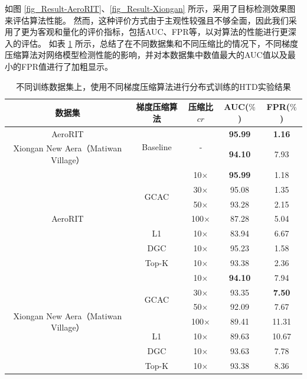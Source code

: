\documentclass{xdupgthesis}
\begin{document}
如图 \ref{fig_Result-AeroRIT}、\ref{fig_Result-Xiongan} 所示，采用了目标检测效果图来评估算法性能。
然而，这种评价方式由于主观性较强且不够全面，因此我们采用了更为客观和量化的评价指标，包括AUC、FPR等，以对算法的性能进行更深入的评估。
如表 \ref{tab_Result-gcc} 所示，总结了在不同数据集和不同压缩比的情况下，不同梯度压缩算法对网络模型检测性能的影响，并对本数据集中数值最大的AUC值以及最小的FPR值进行了加粗显示。

\renewcommand{\arraystretch}{1.3}
\begin{table}[ht]
    \centering
    \begin{threeparttable}
        \caption{不同训练数据集上，使用不同梯度压缩算法进行分布式训练的HTD实验结果}
        \label{tab_Result-gcc}
        \begin{tabular}{c|c|c|c|c}
            \toprule
            \toprule
            数据集 & 梯度压缩算法 & 压缩比$cr$ & AUC($\%$) & FPR($\%$) \\
            \midrule
            AeroRIT & \multirow{2}{*}{Baseline} & \multirow{2}{*}{-} & \textbf{95.99} & \textbf{1.16} \\
            Xiongan New Aera（Matiwan Village） &  &  & \textbf{94.10} & 7.93 \\
            \midrule
            \multirow{7}{*}{AeroRIT} & \multirow{4}{*}{GCAC} & 10$\times$ & \textbf{95.99} & 1.18 \\
             &  & 30$\times$ & 95.08 & 1.35 \\
             &  & 50$\times$ & 93.28 & 2.15 \\
             &  & 100$\times$ & 87.28 & 5.04 \\
             & L1 & 10$\times$ & 83.94 & 6.67 \\
             & DGC\cite{lin2017deep} & 10$\times$ & 95.23 & 1.58 \\
             & Top-K\cite{aji2017sparse} & 10$\times$ & 93.38 & 2.36 \\
            \midrule
            \multirow{7}{*}{Xiongan New Aera（Matiwan Village）} & \multirow{4}{*}{GCAC} & 10$\times$ & \textbf{94.10} & 7.94 \\
             &  & 30$\times$ & 93.35 & \textbf{7.50} \\
             &  & 50$\times$ & 92.09 & 7.67 \\
             &  & 100$\times$ & 89.41 & 11.31 \\
             & L1 & 10$\times$ & 89.63 & 10.67 \\
             & DGC\cite{lin2017deep} & 10$\times$ & 93.63 & 7.78 \\
             & Top-K\cite{aji2017sparse} & 10$\times$ & 93.38 & 8.36 \\
            \bottomrule
            \bottomrule
        \end{tabular}
    \end{threeparttable}
\end{table}
\end{document}
